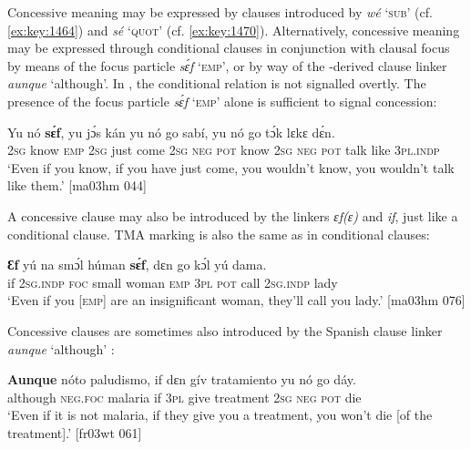 Concessive meaning may be expressed by clauses introduced by \textit{wé} ‘\textsc{sub}’ (cf. \ref{ex:key:1464}) and \textit{sé} ‘\textsc{quot}’ (cf. \ref{ex:key:1470}). Alternatively, concessive meaning may be expressed through conditional clauses in conjunction with clausal focus by means of the focus particle \textit{sɛ́f} ‘\textsc{emp}’, or by way of the -derived clause linker \textit{aunque} ‘although’. In , the conditional relation is not signalled overtly. The presence of the focus particle \textit{sɛ́f} ‘\textsc{emp}’ alone is sufficient to signal concession: 


\ea%
    \label{ex:key:1534}
    \gll Yu  nó    \textbf{sɛ́f},  yu  jɔ́s  kán    yu  nó  go  sabí,
yu  nó  go  tɔ́k  lɛkɛ    dɛ́n.\\
\textsc{2sg}  know  \textsc{emp}  \textsc{2sg}  just  come  \textsc{2sg}  \textsc{neg}  \textsc{pot}  know
\textsc{2sg}  \textsc{neg}  \textsc{pot}  talk  like    \textsc{3pl.indp}\\

\glt ‘Even if you know, if you have just come, you wouldn’t know, 
you wouldn’t talk like them.’ [ma03hm 044]
\z

A concessive clause may also be introduced by the linkers \textit{ɛf(ɛ)} and \textit{if}, just like a conditional clause. TMA marking is also the same as in conditional clauses:


\ea%
    \label{ex:key:1535}
    \gll \textbf{Ɛf}  yú    na  smɔ́l  húman  \textbf{sɛ́f},   dɛn  go  kɔ́l  yú    dama.\\
if  \textsc{2sg.indp}  \textsc{foc}  small  woman  \textsc{emp}  \textsc{3pl}  \textsc{pot}  call  \textsc{2sg.indp}  lady\\

\glt ‘Even if you [\textsc{emp}] are an insignificant woman, they’ll call you lady.’ [ma03hm 076]
\z

Concessive clauses are sometimes also introduced by the Spanish clause linker \textit{aunque} ‘although’ :


\ea%
    \label{ex:key:1536}
    \gll \textbf{Aunque}    nóto  paludismo,  if  dɛn  gív  tratamiento  yu  nó  go  dáy.\\
although    \textsc{neg}.\textsc{foc}  malaria    if  \textsc{3pl}  give  treatment  \textsc{2sg}  \textsc{neg}  \textsc{pot}  die\\

\glt ‘Even if it is not malaria, if they give you a treatment, you won’t die [of the treatment].’ [fr03wt 061]
\z

